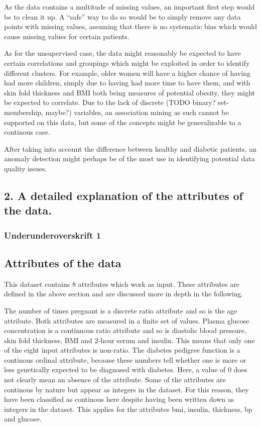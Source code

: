 As the data contains a multitude of missing values,
an important first step would be to clean it up.
A ``safe'' way to do so would be to simply remove any data points
with missing values,
assuming that there is no systematic bias
which would cause missing values for certain patients.

As for the unsupervised case,
the data might reasonably be expected to have certain correlations
and groupings
which might be exploited
in order to identify different clusters.
For example, older women will have a higher chance of having had more children,
simply due to having had more time to have them,
and with skin fold thickness and BMI both being measures of potential obesity,
they might be expected to correlate.
Due to the lack of discrete (TODO binary? set-membership, maybe?) variables,
an association mining as such cannot be supported on this data,
but some of the concepts might be generalizable to a continous case.

After taking into account the difference between healthy and diabetic patients,
an anomaly detection might perhaps be of the most use in identifying
potential data quality issues.

\subsection{2. A detailed explanation of the attributes of the data.}

\subsubsection{Underunderoverskrift 1}


\subsection{Attributes of the data}
This dataset contains 8 attributes which work as input. These attributes are defined in
the above section and are discussed more in depth in the following.

The number of times pregnant is a discrete ratio attribute and so is
the age attribute. Both attributes are measured in a finite set of values.
Plasma glucose concentration is a continuous ratio attribute
and so is diastolic blood pressure, skin fold thickness, BMI and 2-hour serum and
insulin. This means that only one of the eight input attributes is non-ratio.
The diabetes pedigree function is a continous ordinal attribute, because these
numbers tell whether one is more or less genetically expected to be diagnosed
with diabetes. Here, a value of 0 does not clearly mean an absence of the attribute.
Some of the attributes are continous by nature but appear as integers in the dataset.
For this reason, they have been classified as continous here despite having been written
down as integers in the dataset. This applies for the attributes bmi, insulin,
thickness, bp and glucose.
\bigskip

